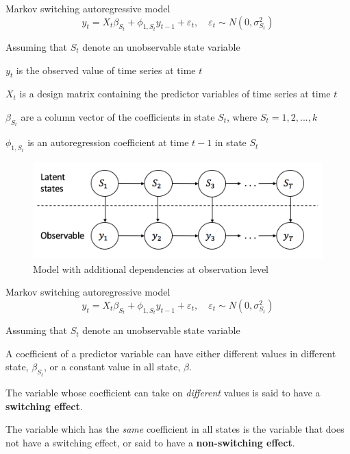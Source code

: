 \documentclass{beamer}
\begin{document}
\begin{frame}

\begin{block}{Markov switching autoregressive model}
\[
y_{t} = X_{t}\beta_{S_{t}} + \phi_{1,S_{t}} y_{t-1} + \varepsilon_{t}, \quad \varepsilon_{t} \sim N(0,\sigma^{2}_{S_{t}})
\]
\end{block}

Assuming that $S_{t}$ denote an unobservable state variable

$y_{t}$ is the observed value of time series at time $t$ 

$X_{t}$ is a design matrix containing the predictor variables of time series at time $t$ 

$\beta_{S_{t}}$ are a column vector of the coefficients in state $S_{t}$, where $S_{t}=1,2,...,k$

$\phi_{1,S_{t}}$ is an autoregression coefficient at time $t-1$ in state $S_{t}$

\begin{figure}
	\includegraphics[width=0.5\linewidth]{msm-ar1}
	\caption{Model with additional dependencies at observation level}
\end{figure}

\end{frame}

\begin{frame}

\begin{block}{Markov switching autoregressive model}
	\[
	y_{t} = X_{t}\beta_{S_{t}} + \phi_{1,S_{t}} y_{t-1} + \varepsilon_{t}, \quad \varepsilon_{t} \sim N(0,\sigma^{2}_{S_{t}})
	\]
\end{block}

Assuming that $S_{t}$ denote an unobservable state variable

\vspace{1em}

A coefficient of a predictor variable can have either different values in different state, $\beta_{S_{t}}$,  or a constant value in all state, $\beta$. 

\vspace{1em}

The variable whose coefficient can take on \textit{different} values is said to have a \textbf{switching effect}. 

\vspace{1em}

The variable which has the \textit{same} coefficient in all states is the variable that does not have a switching effect, or said to have a \textbf{non-switching effect}. 
\end{frame}
\end{document}
